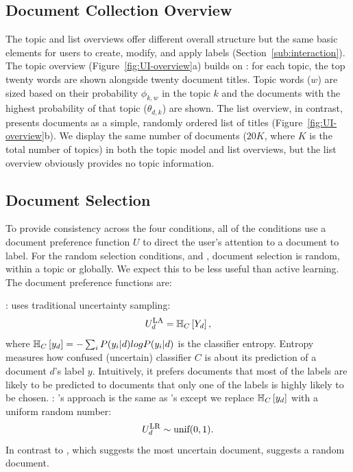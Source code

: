 \subsection{Document Collection Overview}\label{sub:UI}



The topic and list overviews offer different overall structure but the
same basic elements for users to create, modify, and apply labels
(Section~\ref{sub:interaction}). The topic overview
(Figure~\ref{fig:UI-overview}a) builds on : for each
topic, the top twenty words are shown alongside twenty document
titles. Topic words ($w$) are sized based on their probability
$\phi_{k,w}$ in the topic $k$ and the documents with the highest
probability of that topic ($\theta_{d,k}$) are shown.  The list
overview, in contrast, presents documents as a simple, randomly
ordered list of titles (Figure~\ref{fig:UI-overview}b). We
display the same number of documents ($20K$, where $K$ is the total
number of topics) in both the topic model and list overviews, but the
list overview obviously provides no topic information.

\subsection{Document Selection}\label{sub:AL}










To provide consistency across the four conditions,  all of the conditions use a
document preference function $U$ to direct the user's attention to a document to label.  For the random selection
conditions,  and , document selection is random, within a topic or globally.
We expect this to be less useful than active
learning. The document preference functions are:

\noindent
\textbf{}:  uses traditional uncertainty sampling:
\begin{equation}\label{eq:AL_UA}
	U_{d}^{\mbox{\textsc{la}}} = \mathbb{H}_{C}\left[ Y_d \right],
\end{equation}
 where
$\mathbb{H}_{C}\left[ y_d \right] = -\sum_{i} P(y_i|d)log P(y_i|d)$ is the classifier entropy. Entropy measures how confused (uncertain) classifier $C$ is about its prediction of a document $d$'s label $y$. Intuitively, it prefers documents that most of the labels are likely to be predicted to documents that only one of the labels is highly likely to be chosen.
\noindent
\textbf{}: 's approach is the same as 's
except we replace $\mathbb{H}_{C}\left[ y_d \right]$ with a uniform random number:
\begin{equation}\label{eq:AL_UR}
	U_{d}^{\mbox{\textsc{lr}}} \sim \mbox{unif}(0,1).
\end{equation}
 In contrast to , which suggests the most uncertain document,  suggests a random document.

